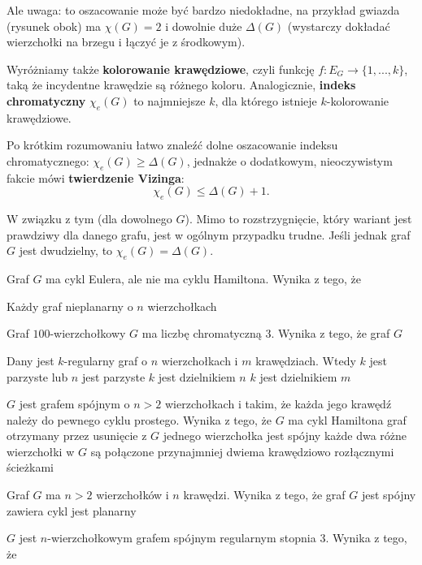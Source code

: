 Ale uwaga: to oszacowanie może być bardzo niedokładne, na przykład gwiazda (rysunek obok) ma $\chi(G) = 2$ i dowolnie duże $\Delta(G)$ (wystarczy dokładać wierzchołki na brzegu i łączyć je z środkowym).
\bigskip

Wyróżniamy także \textbf{kolorowanie krawędziowe}, czyli funkcję $f : E_G \to \{1, ..., k\}$, taką że incydentne krawędzie są różnego koloru. Analogicznie, \textbf{indeks chromatyczny} $\chi_e(G)$ to najmniejsze $k$, dla którego istnieje $k$-kolorowanie krawędziowe.

Po krótkim rozumowaniu łatwo znaleźć dolne oszacowanie indeksu chromatycznego: $\chi_e(G) \geq \Delta(G)$, jednakże o dodatkowym, nieoczywistym fakcie mówi \textbf{twierdzenie Vizinga}: $$\chi_e(G) \leq \Delta(G) + 1.$$

W związku z tym  (dla dowolnego $G$). Mimo to rozstrzygnięcie, który wariant jest prawdziwy dla danego grafu, jest w ogólnym przypadku trudne. Jeśli jednak graf $G$ jest dwudzielny, to $\chi_e(G) = \Delta(G)$.

\begin{problems}
    \prob Graf $G$ ma cykl Eulera, ale nie ma cyklu Hamiltona. Wynika z tego, że

    \prob Każdy graf nieplanarny o $n$ wierzchołkach

    \prob Graf $100$-wierzchołkowy $G$ ma liczbę chromatyczną $3$. Wynika z tego, że graf $G$

    \prob Dany jest $k$-regularny graf o $n$ wierzchołkach i $m$ krawędziach. Wtedy
    \answers
    {$k$ jest parzyste lub $n$ jest parzyste}
    {$k$ jest dzielnikiem $n$}
    {$k$ jest dzielnikiem $m$}

    \prob $G$ jest grafem spójnym o $n > 2$ wierzchołkach i takim, że każda jego krawędź należy do pewnego cyklu prostego. Wynika z tego, że
    \answers
    {$G$ ma cykl Hamiltona}
    {graf otrzymany przez usunięcie z $G$ jednego wierzchołka jest spójny}
    {każde dwa różne wierzchołki w $G$ są połączone przynajmniej dwiema krawędziowo rozłącznymi ścieżkami}

    \prob Graf $G$ ma $n > 2$ wierzchołków i $n$ krawędzi. Wynika z tego, że graf $G$
    \answers
    {jest spójny}
    {zawiera cykl}
    {jest planarny}

    \prob $G$ jest $n$-wierzchołkowym grafem spójnym regularnym stopnia 3. Wynika z tego, że
\end{problems}

